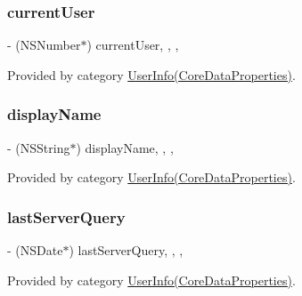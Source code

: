\subsubsection{\texorpdfstring{current\+User}{currentUser}}
{\footnotesize\ttfamily -\/ (N\+S\+Number$\ast$) current\+User\hspace{0.3cm}{\ttfamily [read]}, {\ttfamily [write]}, {\ttfamily [nonatomic]}, {\ttfamily [retain]}}



Provided by category \hyperlink{category_user_info_07_core_data_properties_08_a725f8b96488308d73380d050eed90b95}{User\+Info(\+Core\+Data\+Properties)}.

\hypertarget{interface_user_info_ae3f7388231cb3ebbeb37678e809b39c8}{}\label{interface_user_info_ae3f7388231cb3ebbeb37678e809b39c8} 
\subsubsection{\texorpdfstring{display\+Name}{displayName}}
{\footnotesize\ttfamily -\/ (N\+S\+String$\ast$) display\+Name\hspace{0.3cm}{\ttfamily [read]}, {\ttfamily [write]}, {\ttfamily [nonatomic]}, {\ttfamily [retain]}}



Provided by category \hyperlink{category_user_info_07_core_data_properties_08_ae3f7388231cb3ebbeb37678e809b39c8}{User\+Info(\+Core\+Data\+Properties)}.

\hypertarget{interface_user_info_aab2017ab16d2bef45391eaeec44b71d0}{}\label{interface_user_info_aab2017ab16d2bef45391eaeec44b71d0} 
\subsubsection{\texorpdfstring{last\+Server\+Query}{lastServerQuery}}
{\footnotesize\ttfamily -\/ (N\+S\+Date$\ast$) last\+Server\+Query\hspace{0.3cm}{\ttfamily [read]}, {\ttfamily [write]}, {\ttfamily [nonatomic]}, {\ttfamily [retain]}}



Provided by category \hyperlink{category_user_info_07_core_data_properties_08_aab2017ab16d2bef45391eaeec44b71d0}{User\+Info(\+Core\+Data\+Properties)}.

